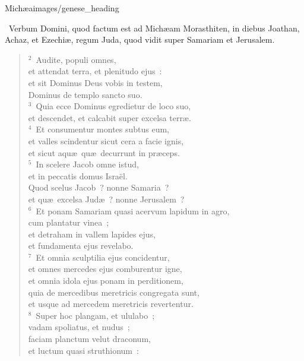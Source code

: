 {Michæa}{images/genese_heading}

~\lettrine[lines=10,image=true,loversize=0.05,lraise=-0.03]{V}{}erbum Domini, quod factum est ad Mich\ae am Morasthiten, in diebus Joathan, Achaz, et Ezechi\ae , regum Juda, quod vidit super Samariam et Jerusalem.


\begin{flushleft}\begin{verse}\vspace{6pt}${}^{2}$~Audite, populi omnes,\\ et attendat terra, et plenitudo ejus~:\\ et sit Dominus Deus vobis in testem,\\ Dominus de templo sancto suo.\\
${}^{3}$~Quia ecce Dominus egredietur de loco suo,\\ et descendet, et calcabit super excelsa terr\ae .\\
${}^{4}$~Et consumentur montes subtus eum,\\ et valles scindentur sicut cera a facie ignis,\\ et sicut aqu\ae\ qu\ae\ decurrunt in pr\ae ceps.\\
${}^{5}$~In scelere Jacob omne istud,\\ et in peccatis domus Isra\"el.\\ Quod scelus Jacob~? nonne Samaria~?\\ et qu\ae\ excelsa Jud\ae~? nonne Jerusalem~?\\
${}^{6}$~Et ponam Samariam quasi acervum lapidum in agro,\\ cum plantatur vinea~;\\ et detraham in vallem lapides ejus,\\ et fundamenta ejus revelabo.\\
${}^{7}$~Et omnia sculptilia ejus concidentur,\\ et omnes mercedes ejus comburentur igne,\\ et omnia idola ejus ponam in perditionem,\\ quia de mercedibus meretricis congregata sunt,\\ et usque ad mercedem meretricis revertentur.\\
${}^{8}$~Super hoc plangam, et ululabo~;\\ vadam spoliatus, et nudus~;\\ faciam planctum velut draconum,\\ et luctum quasi struthionum~:\\

\end{verse}
\end{flushleft}
